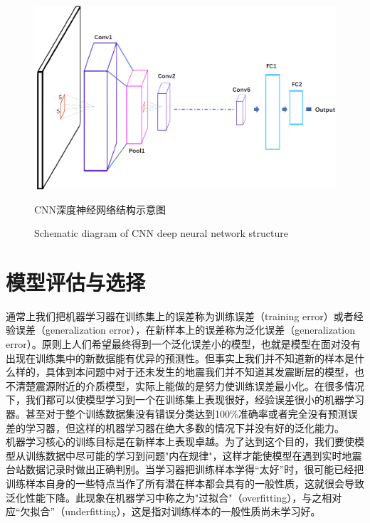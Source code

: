 \begin{figure}[h] 
\centering 
 \includegraphics[width=0.99\linewidth]{img/CNN-paper.png} 
 \renewcommand{\figurename}{图} 
\caption{CNN深度神经网络结构示意图} 
\addtocounter{figure}{-1} \vspace{-5pt} 
\renewcommand{\figurename}{Fig} 
\caption{Schematic diagram of CNN deep neural network structure} 
\renewcommand{\figurename}{图} 
\label{fig:network-device-influence.png} 
\end{figure}
\section{模型评估与选择}
 \indent 通常上我们把机器学习器在训练集上的误差称为训练误差（training error）或者经验误差（generalization error），在新样本上的误差称为泛化误差（generalization error）。原则上人们希望最终得到一个泛化误差小的模型，也就是模型在面对没有出现在训练集中的新数据能有优异的预测性。但事实上我们并不知道新的样本是什么样的，具体到本问题中对于还未发生的地震我们并不知道其发震断层的模型，也不清楚震源附近的介质模型，实际上能做的是努力使训练误差最小化。在很多情况下，我们都可以使模型学习到一个在训练集上表现很好，经验误差很小的机器学习器。甚至对于整个训练数据集没有错误分类达到100\%准确率或者完全没有预测误差的学习器，但这样的机器学习器在绝大多数的情况下并没有好的泛化能力。\\
 \indent 机器学习核心的训练目标是在新样本上表现卓越。为了达到这个目的，我们要使模型从训练数据中尽可能的学习到问题"内在规律"，这样才能使模型在遇到实时地震台站数据记录时做出正确判别。当学习器把训练样本学得“太好”时，很可能已经把训练样本自身的一些特点当作了所有潜在样本都会具有的一般性质，这就很会导致泛化性能下降。此现象在机器学习中称之为"过拟合"（overfitting），与之相对应“欠拟合”（underfitting），这是指对训练样本的一般性质尚未学习好。
 
